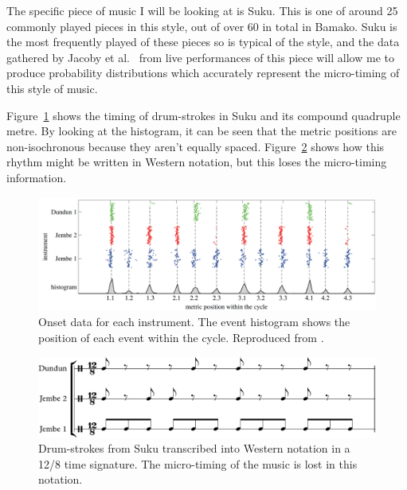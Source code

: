 \documentclass[12pt,twoside,openright]{report}
\begin{document}
\begin{refsection}
The specific piece of music I will be looking at is Suku. This is one of around
25 commonly played pieces in this style, out of over 60 in total in Bamako. Suku
is the most frequently played of these pieces so is typical of the style, and
the data gathered by Jacoby et al.\ \cite{jacoby2021} from live performances of this piece will
allow me to produce probability distributions which accurately represent the
micro-timing of this style of music.

Figure~\ref{fig:proposal_histogram} shows the timing of drum-strokes in Suku and its compound quadruple
metre. By looking at the histogram, it can be seen that the metric positions are
non-isochronous because they aren't equally spaced. Figure~\ref{fig:proposal_transcription} shows how this
rhythm might be written in Western notation, but this loses the micro-timing
information.

\begin{figure}[ht]
    \includegraphics[width=\linewidth]{figures/proposal/histograms.png}
    \caption{Onset data for each instrument. The event histogram shows the position of each event within the cycle. Reproduced from \cite{jacoby2021}.}
    \label{fig:proposal_histogram}
\end{figure}

\begin{figure}[ht]
    \includegraphics[width=\linewidth]{figures/proposal/transcription.pdf}
    \caption{Drum-strokes from Suku transcribed into Western notation in a 12/8 time signature. The micro-timing of the music is lost in this notation.}
    \label{fig:proposal_transcription}
\end{figure}




\end{refsection}
\end{document}

